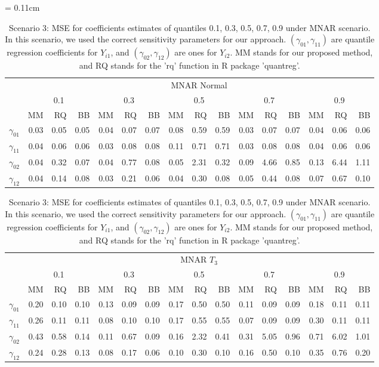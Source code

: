 \documentclass[12pt]{article}
\begin{document}
\begin{table}[h]
  \renewcommand{\arraystretch}{1.3}
  \centering
  \caption{Scenario 3: MSE for coefficients estimates of quantiles
    0.1, 0.3, 0.5, 0.7, 0.9 under MNAR scenario. In this scenario, we used the correct
    sensitivity parameters
    for our approach. $(\gamma_{01}, \gamma_{11})$
    are quantile regression coefficients for $Y_{i1}$, and $(\gamma_{02}, \gamma_{12})$
    are ones for $Y_{i2}$. MM stands for our proposed method, and RQ stands for the 'rq'
    function in R package 'quantreg'.} \label{tab:sim3}
  \vspace{10pt}
  \tabcolsep = 0.11cm
  \begin{tabular}{rrrrrrrrrrrrrrrr}
    \toprule
    & \multicolumn{15}{c}{MNAR Normal} \\
    \cline{2-16}
    &  \multicolumn{3}{c}{0.1} &  \multicolumn{3}{c}{0.3} &  \multicolumn{3}{c}{0.5} &
    \multicolumn{3}{c}{0.7} &  \multicolumn{3}{c}{0.9} \\
    \cline{2-16}
    & MM   & RQ   & BB   & MM   & RQ   & BB   & MM   & RQ   & BB   & MM   & RQ   & BB   & MM   & RQ   & BB   \\
    \hline
    $\gamma_{01}$ & 0.03 & 0.05 & 0.05 & 0.04 & 0.07 & 0.07 & 0.08 & 0.59 & 0.59 & 0.03 & 0.07 & 0.07 & 0.04 & 0.06 & 0.06\\
    $\gamma_{11}$ & 0.04 & 0.06 & 0.06 & 0.03 & 0.08 & 0.08 & 0.11 & 0.71 & 0.71 & 0.03 & 0.08 & 0.08 & 0.04 & 0.06 & 0.06\\
    $\gamma_{02}$ & 0.04 & 0.32 & 0.07 & 0.04 & 0.77 & 0.08 & 0.05 & 2.31 & 0.32 & 0.09 & 4.66 & 0.85 & 0.13 & 6.44 & 1.11\\
    $\gamma_{12}$ & 0.04 & 0.14 & 0.08 & 0.03 & 0.21 & 0.06 & 0.04 & 0.30 & 0.08 & 0.05 & 0.44 & 0.08 & 0.07 & 0.67 & 0.10\\
    \bottomrule
  \end{tabular}
  \begin{tabular}{rrrrrrrrrrrrrrrr}
    \toprule
    & \multicolumn{15}{c}{MNAR $T_3$} \\
    \cline{2-16}
    &  \multicolumn{3}{c}{0.1} &  \multicolumn{3}{c}{0.3} &  \multicolumn{3}{c}{0.5} &
    \multicolumn{3}{c}{0.7} &  \multicolumn{3}{c}{0.9} \\
    \cline{2-16}
    & MM   & RQ   & BB   & MM   & RQ   & BB   & MM   & RQ   & BB   & MM   & RQ   & BB   & MM   & RQ   & BB   \\
    \hline
    $\gamma_{01}$ & 0.20 & 0.10 & 0.10 & 0.13 & 0.09 & 0.09 & 0.17 & 0.50 & 0.50 & 0.11 & 0.09 & 0.09 & 0.18 & 0.11 & 0.11 \\
    $\gamma_{11}$ & 0.26 & 0.11 & 0.11 & 0.08 & 0.10 & 0.10 & 0.17 & 0.55 & 0.55 & 0.07 & 0.09 & 0.09 & 0.30 & 0.11 & 0.11 \\
    $\gamma_{02}$ & 0.43 & 0.58 & 0.14 & 0.11 & 0.67 & 0.09 & 0.16 & 2.32 & 0.41 & 0.31 & 5.05 & 0.96 & 0.71 & 6.02 & 1.01 \\
    $\gamma_{12}$ & 0.24 & 0.28 & 0.13 & 0.08 & 0.17 & 0.06 & 0.10 & 0.30 & 0.10 & 0.16 & 0.50 & 0.10 & 0.35 & 0.76 & 0.20 \\
    \bottomrule
  \end{tabular}


\end{table}
\end{document}
